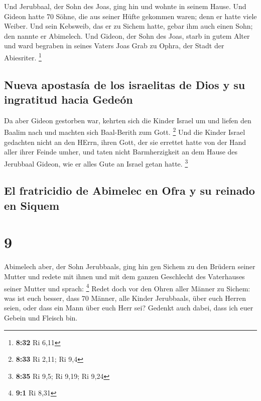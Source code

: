  Und Jerubbaal, der Sohn des Joas, ging hin und wohnte in
seinem Hause.  Und Gideon hatte 70 Söhne, die aus seiner
Hüfte gekommen waren; denn er hatte viele Weiber.  Und
sein Kebsweib, das er zu Sichem hatte, gebar ihm auch einen Sohn; den
nannte er Abimelech.  Und Gideon, der Sohn des Joas,
starb in gutem Alter und ward begraben in seines Vaters Joas Grab zu
Ophra, der Stadt der Abiesriter. \footnote{\textbf{8:32} Ri 6,11}

\hypertarget{nueva-apostasuxeda-de-los-israelitas-de-dios-y-su-ingratitud-hacia-gedeuxf3n}{%
\subsection{Nueva apostasía de los israelitas de Dios y su ingratitud
hacia
Gedeón}\label{nueva-apostasuxeda-de-los-israelitas-de-dios-y-su-ingratitud-hacia-gedeuxf3n}}

 Da aber Gideon gestorben war, kehrten sich die Kinder
Israel um und liefen den Baalim nach und machten sich Baal-Berith zum
Gott. \footnote{\textbf{8:33} Ri 2,11; Ri 9,4}  Und die
Kinder Israel gedachten nicht an den HErrn, ihren Gott, der sie errettet
hatte von der Hand aller ihrer Feinde umher,  und taten
nicht Barmherzigkeit an dem Hause des Jerubbaal Gideon, wie er alles
Gute an Israel getan hatte. \footnote{\textbf{8:35} Ri 9,5; Ri 9,19; Ri
  9,24}

\hypertarget{el-fratricidio-de-abimelec-en-ofra-y-su-reinado-en-siquem}{%
\subsection{El fratricidio de Abimelec en Ofra y su reinado en
Siquem}\label{el-fratricidio-de-abimelec-en-ofra-y-su-reinado-en-siquem}}

\hypertarget{section-8}{%
\section{9}\label{section-8}}

 Abimelech aber, der Sohn Jerubbaals, ging hin gen Sichem
zu den Brüdern seiner Mutter und redete mit ihnen und mit dem ganzen
Geschlecht des Vaterhauses seiner Mutter und sprach: \footnote{\textbf{9:1}
  Ri 8,31}  Redet doch vor den Ohren aller Männer zu
Sichem: was ist euch besser, dass 70 Männer, alle Kinder Jerubbaals,
über euch Herren seien, oder dass ein Mann über euch Herr sei? Gedenkt
auch dabei, dass ich euer Gebein und Fleisch bin.

